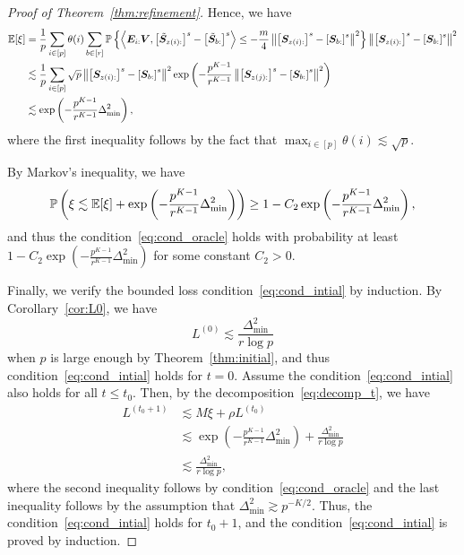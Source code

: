 \documentclass[lettersize,onecolumn,journal]{IEEEtran}
\theoremstyle{definition}
\theoremstyle{definition}
\newcommand{\of}[1]{\left(#1\right)}
\newcommand{\off}[1]{\left[#1\right]}
\newcommand{\offf}[1]{\left\{#1\right\}}
\newcommand{\ang}[1]{\left\langle#1\right\rangle}
\begin{document}
\begin{proof}[Proof of Theorem~\ref{thm:refinement}]
    Hence, we have 
    \begin{align}
        \bbE[\xi] & =  \frac{1}{p} \sum_{i \in [p]} \theta(i) \sum_{b \in [r]} \bbP \offf{  \ang{ \mE_{i:} \mV, \off{  \tilde \mS_{z(i):} }^s - \off{  \tilde \mS_{b:} }^s }  \leq - \frac{ m}{4} \onorm{ \off{ \mS_{z(i):}  }^s - \off{ \mS_{b:}  }^s  }^2 } \onorm{ \off{ \mS_{z(i):}  }^s - \off{ \mS_{ b:}  }^s  }^2 \\
        &\lesssim \frac{1}{p} \sum_{i \in [p]}  \sqrt{p} \onorm{ \off{ \mS_{z(i):}  }^s - \off{ \mS_{b:}  }^s  }^2   \exp \of{  - \frac{p^{K-1}}{r^{K-1}}   \onorm{ \off{ \mS_{z(j):}  }^s - \off{ \mS_{b:}  }^s  }^2 } \\
        & \lesssim  \exp \of{  - \frac{p^{K-1}}{r^{K-1}}   \Delta_{\min}^2 },
    \end{align}
    where the first inequality follows by the fact that $\max_{i \in [p]} \theta(i) \lesssim \sqrt{p}$.
    
    By Markov's inequality, we have 
    \begin{equation}
        \bbP\of{ \xi \lesssim \bbE[\xi] + \exp \of{  - \frac{p^{K-1}}{r^{K-1}}   \Delta_{\min}^2 } } \geq 1 -  C_2 \exp \of{  - \frac{p^{K-1}}{r^{K-1}}   \Delta_{\min}^2 },
    \end{equation}
    and thus the condition~\eqref{eq:cond_oracle} holds with probability at least $1 -  C_2 \exp \of{  - \frac{p^{K-1}}{r^{K-1}}   \Delta_{\min}^2 }$ for some constant $C_2 > 0$.
    
    Finally, we verify the bounded loss condition~\eqref{eq:cond_intial} by induction. By Corollary~\ref{cor:L0}, we have 
    \begin{equation}
        L^{(0)} \lesssim \frac{\Delta_{\min}^2}{r \log p}
    \end{equation}
    when $p$ is large enough by Theorem~\ref{thm:initial}, and thus condition~\eqref{eq:cond_intial} holds for $t = 0$. Assume the condition~\eqref{eq:cond_intial} also holds for all $t \leq t_0$. Then, by the decomposition~\eqref{eq:decomp_t}, we have 
    \begin{align}
         L^{(t_0+1)} &\lesssim M \xi + \rho L^{(t_0)} \\
         & \lesssim  \exp \of{  - \frac{p^{K-1}}{r^{K-1}}   \Delta_{\min}^2 } + \frac{\Delta_{\min}^2}{r \log p} \\
         & \lesssim \frac{\Delta_{\min}^2}{r\log p} ,
    \end{align}
    where the second inequality follows by condition~\eqref{eq:cond_oracle} and the last inequality follows by the assumption that $\Delta_{\min}^2 \gtrsim p^{-K/2}$. Thus, the condition~\eqref{eq:cond_intial} holds for $t_0 + 1$, and the condition~\eqref{eq:cond_intial} is proved by induction.
\end{proof}
\end{document}

